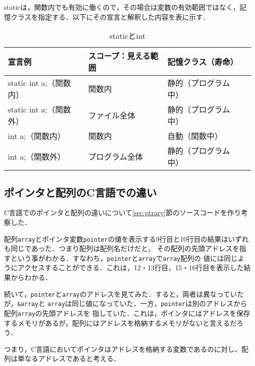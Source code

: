 \documentclass[a4j,11pt]{jarticle}
\begin{document}
staticは，関数内でも有効に働くので，その場合は変数の有効範囲ではなく，記憶クラスを指定する．以下にその宣言と解釈した内容を表に示す．
\begin{table}[htb]
  \label{tab:table1}
  \centering
  \begin{tabular}{|l|l|l|l|}
  \hline
  宣言例                & スコープ：見える範囲 & 記憶クラス（寿命）  \\ \hline
  static int a;（関数内） & 関数内        & 静的（プログラム中） \\ \hline
  static int a;（関数外） & ファイル全体     & 静的（プログラム中） \\ \hline
  int a;（関数内）        & 関数内        & 自動（関数中）    \\ \hline
  int a;（関数外）        & プログラム全体    & 静的（プログラム中） \\ \hline
  \end{tabular}
  \caption{staticとint}
  \end{table}

\subsection{ポインタと配列のC言語での違い}
C言語でのポインタと配列の違いについて\ref{sec:ptrary}節のソースコードを作り考察した．

配列\verb|array|とポインタ変数\verb|pointer|の値を表示する9行目と10行目の結果はいずれも同じであった．つまり配列は配列名だけだと，
その配列の先頭アドレスを指すという事がわかる．すなわち，\verb|pointer|と\verb|array|で\verb|array|配列の
値には同じようにアクセスすることができる．これは，12・13行目，15・16行目を表示した結果からわかる．

続いて，\verb|pointer|と\verb|array|のアドレスを見てみた．すると，両者は異なっていたが，\verb|&array|と
\verb|array|は同じ値になっていた．一方，\verb|pointer|は別のアドレスから配列\verb|array|の先頭アドレスを
指していた．これは，ポインタにはアドレスを保存するメモリがあるが，配列にはアドレスを格納するメモリがないと言えるだろう．

つまり，C言語においてポインタはアドレスを格納する変数であるのに対し、配列は単なるアドレスであると考える．
\end{document}
